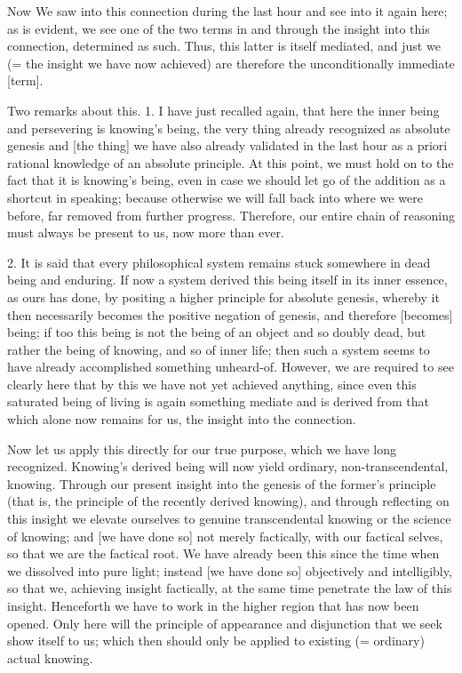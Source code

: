 Now We saw into this connection during the last hour
and see into it again here;
as is evident, we see one of the two terms
in and through the insight into this connection,
determined as such.
Thus, this latter is itself mediated,
and just we (= the insight we have now achieved) are
therefore the unconditionally immediate [term].

Two remarks about this.
1. I have just recalled again,
that here the inner being and persevering is knowing’s being,
the very thing already recognized as absolute genesis
and [the thing] we have also already validated in the last hour
as a priori rational knowledge of an absolute principle.
At this point, we must hold on to
the fact that it is knowing’s being,
even in case we should let go of
the addition as a shortcut in speaking;
because otherwise we will fall back into
where we were before, far removed from further progress.
Therefore, our entire chain of reasoning
must always be present to us, now more than ever.

2. It is said that every philosophical system
remains stuck somewhere in dead being and enduring.
If now a system derived this being itself in its inner essence,
as ours has done, by positing a higher principle for absolute genesis,
whereby it then necessarily becomes the positive negation of genesis,
and therefore [becomes] being;
if too this being is not the being of an object and so doubly dead,
but rather the being of knowing, and so of inner life;
then such a system seems to have already
accomplished something unheard-of.
However, we are required to see clearly here that
by this we have not yet achieved anything,
since even this saturated being of living is
again something mediate and is derived from that
which alone now remains for us,
the insight into the connection.

Now let us apply this directly for our true purpose,
which we have long recognized.
Knowing’s derived being will now yield
ordinary, non-transcendental, knowing.
Through our present insight into
the genesis of the former’s principle
(that is, the principle of the recently derived knowing),
and through reflecting on this insight
we elevate ourselves to genuine transcendental knowing
or the science of knowing;
and [we have done so] not merely factically,
with our factical selves,
so that we are the factical root.
We have already been this since
the time when we dissolved into pure light;
instead [we have done so] objectively and intelligibly,
so that we, achieving insight factically,
at the same time penetrate the law of this insight.
Henceforth we have to work in the higher region
that has now been opened.
Only here will the principle of
appearance and disjunction
that we seek show itself to us;
which then should only be applied
to existing (= ordinary) actual knowing.

